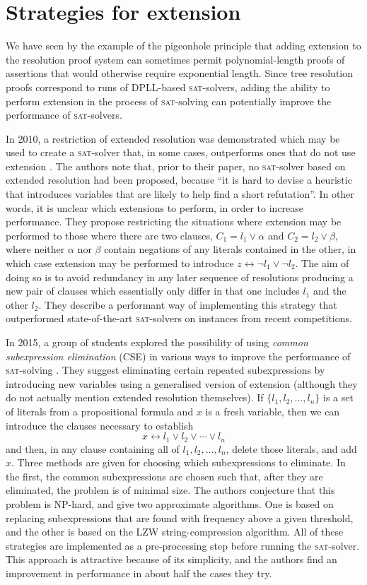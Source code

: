 \documentclass[proof,pdftex,11pt,a4,titlepage]{article}
\newcommand{\sat}{\textsc{sat}}
\begin{document}
\section{Strategies for extension}

We have seen by the example of the pigeonhole principle that adding extension to the resolution proof system can sometimes permit polynomial-length proofs of assertions that would otherwise require exponential length. Since tree resolution proofs correspond to runs of DPLL-based \sat{}-solvers, adding the ability to perform extension in the process of \sat{}-solving can potentially improve the performance of \sat{}-solvers.

In 2010, a restriction of extended resolution was demonstrated which may be used to create a \sat{}-solver that, in some cases, outperforms ones that do not use extension \cite{Audemard:2010}. The authors note that, prior to their paper, no \sat{}-solver based on extended resolution had been proposed, because ``it is hard to devise a heuristic that introduces variables that are likely to help find a short refutation''. In other words, it is unclear which extensions to perform, in order to increase performance. They propose restricting the situations where extension may be performed to those where there are two clauses, $C_1 = l_1 \vee \alpha$ and $C_2 = l_2 \vee \beta$, where neither $\alpha$ nor $\beta$ contain negations of any literals contained in the other, in which case extension may be performed to introduce $z \leftrightarrow \neg l_1 \vee \neg l_2$. The aim of doing so is to avoid redundancy in any later sequence of resolutions producing a new pair of clauses which essentially only differ in that one includes $l_1$ and the other $l_2$. They describe a performant way of implementing this strategy that outperformed state-of-the-art \sat{}-solvers on instances from recent competitions.

In 2015, a group of students explored the possibility of using \emph{common subexpression elimination} (CSE) in various ways to improve the performance of \sat{}-solving \cite{Yan:2015}. They suggest eliminating certain repeated subexpressions by introducing new variables using a generalised version of extension (although they do not actually mention extended resolution themselves). If $\{l_1, l_2, \ldots, l_n\}$ is a set of literals from a propositional formula and $x$ is a fresh variable, then we can introduce the clauses necessary to establish
\[x \leftrightarrow l_1 \vee l_2 \vee \cdots \vee l_n\]
and then, in any clause containing all of $l_1, l_2, \ldots, l_n$, delete those literals, and add $x$. Three methods are given for choosing which subexpressions to eliminate. In the first, the common subexpressions are chosen such that, after they are eliminated, the problem is of minimal size. The authors conjecture that this problem is NP-hard, and give two approximate algorithms. One is based on replacing subexpressions that are found with frequency above a given threshold, and the other is based on the LZW string-compression algorithm. All of these strategies are implemented as a pre-processing step before running the \sat{}-solver. This approach is attractive because of its simplicity, and the authors find an improvement in performance in about half the cases they try.
\end{document}
